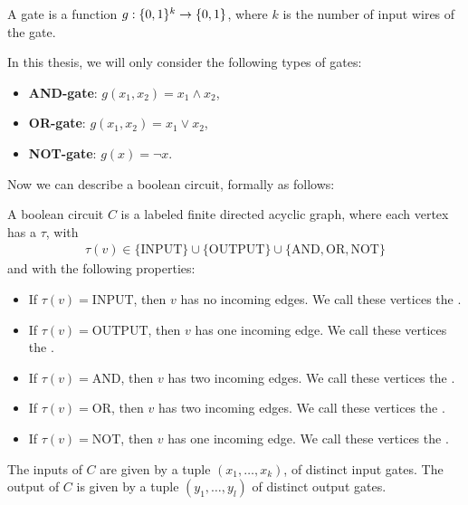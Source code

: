 \begin{definition}[Gate]
    A gate is a function $g : \{0, 1\}^k \rightarrow \{0, 1\}$, where $k$ is the number of input wires of the gate.
\end{definition}

In this thesis, we will only consider the following types of gates:
\begin{itemize}
    \item \textbf{AND-gate}: $g(x_1, x_2) = x_1 \land x_2$,
    \item \textbf{OR-gate}: $g(x_1, x_2) = x_1 \lor x_2$,
    \item \textbf{NOT-gate}: $g(x) = \lnot x$.
\end{itemize}

Now we can describe a boolean circuit, formally as follows:
\begin{definition}
    A boolean circuit $C$ is a labeled finite directed acyclic graph, where each vertex has a  $\tau$, with
    \begin{align*}
        \tau(v) \in \{\text{INPUT}\} \cup \{\text{OUTPUT}\} \cup \{\text{AND}, \text{OR}, \text{NOT}\}
    \end{align*}
    and with the following properties:
    \begin{itemize}
        \item If $\tau(v) = \text{INPUT}$, then $v$ has no incoming edges. We call these vertices the .
        \item If $\tau(v) = \text{OUTPUT}$, then $v$ has one incoming edge. We call these vertices the .
        \item If $\tau(v) = \text{AND}$, then $v$ has two incoming edges. We call these vertices the .
        \item If $\tau(v) = \text{OR}$, then $v$ has two incoming edges. We call these vertices the .
        \item If $\tau(v) = \text{NOT}$, then $v$ has one incoming edge. We call these vertices the .
    \end{itemize}
    The inputs of $C$ are given by a tuple $(x_1, \dots, x_k)$, of distinct input gates. The output of $C$ is given by a tuple $(y_1, \dots, y_l)$ of distinct output gates.
\end{definition}

